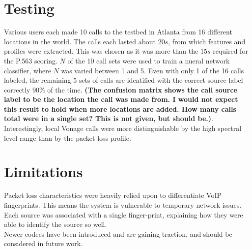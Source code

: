 \documentclass{article}
\begin{document}
\section{Testing}
Various users each made 10 calls to the testbed in Atlanta from 16 different locations in the world.
The calls each lasted about $20 s$, from which features and profiles were extracted.
This was chosen as it was more than the $15 s$ required for the P.563 scoring.
$N$ of the 10 call sets were used to train a nueral network classifier,
where $N$ was varied between 1 and 5.
Even with only 1 of the 16 calls labeled,
the remaining 5 sets of calls are identified with the correct source label correctly $90\%$ of the time.
{\bf(The confusion matrix shows the call source label to be the location the call was made from.
  I would not expect this result to hold when more locations are added.
  How many calls total were in a single set? This is not given, but should be.)}.
Interestingly, local Vonage calls were more distinguishable by the high spectral level range than by the packet loss profile.
\section{Limitations}
Packet loss characteristics were heavily relied upon to differentiate VoIP fingerprints.
This means the system is vulnerable to temporary network issues.\\
Each source was associated with a single finger-print, explaining how they were able to identify the source so well.\\
Newer codecs have been introduced and are gaining traction,
and should be considered in future work.
\end{document}
